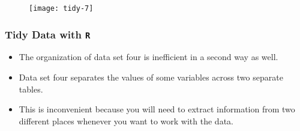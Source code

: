 \documentclass[TIDYMASTER.tex]{subfiles}
\begin{document}
\begin{frame}
	\begin{figure}
		\centering
		\texttt{[image: tidy-7]}
	
	\end{figure}
	
\end{frame}
\begin{frame}[fragile]
	\frametitle{Tidy Data with \texttt{R}}
	\Large
	\begin{itemize}
		\item The organization of data set four is inefficient in a second way as well. 
		\item Data set four separates the values of some variables across two separate tables. 
		\item This is inconvenient because you will need to extract information from two different places whenever you want to work with the data.
	\end{itemize}
\end{frame}
%	
\end{document}
